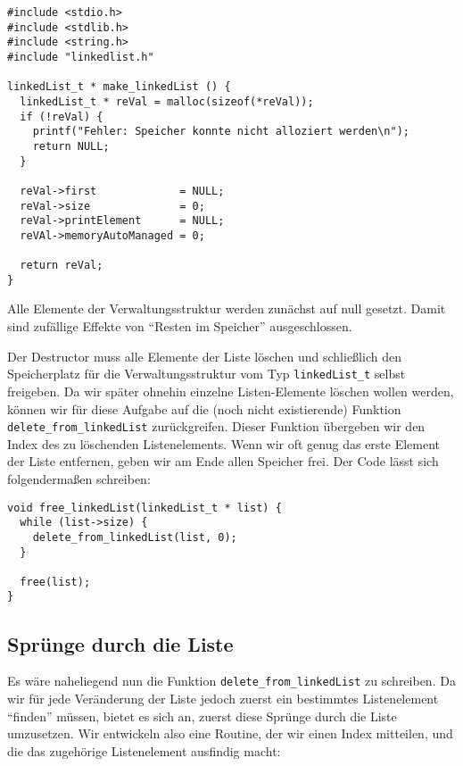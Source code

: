 \begin{codebox}
\begin{verbatim}
#include <stdio.h>
#include <stdlib.h>
#include <string.h>
#include "linkedlist.h"

linkedList_t * make_linkedList () {
  linkedList_t * reVal = malloc(sizeof(*reVal));
  if (!reVal) {
    printf("Fehler: Speicher konnte nicht alloziert werden\n");
    return NULL;
  }
  
  reVal->first             = NULL;
  reVal->size              = 0;
  reVal->printElement      = NULL;
  reVAl->memoryAutoManaged = 0;
  
  return reVal;
}
\end{verbatim}
\end{codebox}

Alle Elemente der Verwaltungsstruktur werden zunächst auf null gesetzt. Damit sind zufällige Effekte von \enquote{Resten im Speicher} ausgeschlossen.

Der Destructor muss alle Elemente der Liste löschen und schließlich den Speicherplatz für die Verwaltungsstruktur vom Typ \texttt{linkedList\_t} selbst freigeben. Da wir später ohnehin einzelne Listen-Elemente löschen wollen werden, können wir für diese Aufgabe auf die (noch nicht existierende) Funktion \texttt{delete\_from\_linkedList} zurückgreifen. Dieser Funktion übergeben wir den Index des zu löschenden Listenelements. Wenn wir oft genug das erste Element der Liste entfernen, geben wir am Ende allen Speicher frei. Der Code lässt sich folgendermaßen schreiben:

\begin{codebox}
\begin{verbatim}
void free_linkedList(linkedList_t * list) {
  while (list->size) {
    delete_from_linkedList(list, 0);
  }
  
  free(list);
}
\end{verbatim}
\end{codebox}

\subsection{Sprünge durch die Liste}
Es wäre naheliegend nun die Funktion \texttt{delete\_from\_linkedList} zu schreiben. Da wir für jede Veränderung der Liste jedoch zuerst ein bestimmtes Listenelement \enquote{finden} müssen, bietet es sich an, zuerst diese Sprünge durch die Liste umzusetzen. Wir entwickeln also eine Routine, der wir einen Index mitteilen, und die das zugehörige Listenelement ausfindig macht:

